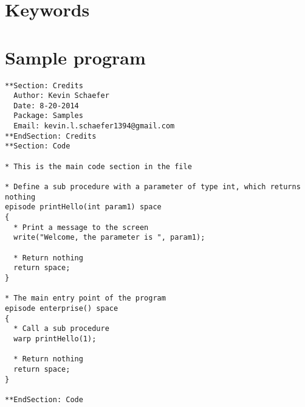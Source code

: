 \documentclass{book}
\begin{document}
\section{Keywords}

\section{Sample program}
\begin{lstlisting}
**Section: Credits
  Author: Kevin Schaefer
  Date: 8-20-2014
  Package: Samples
  Email: kevin.l.schaefer1394@gmail.com
**EndSection: Credits
**Section: Code

* This is the main code section in the file

* Define a sub procedure with a parameter of type int, which returns nothing
episode printHello(int param1) space
{
  * Print a message to the screen
  write("Welcome, the parameter is ", param1);

  * Return nothing
  return space;
}

* The main entry point of the program
episode enterprise() space
{
  * Call a sub procedure
  warp printHello(1);

  * Return nothing
  return space;
}

**EndSection: Code
\end{lstlisting}
\end{document}
